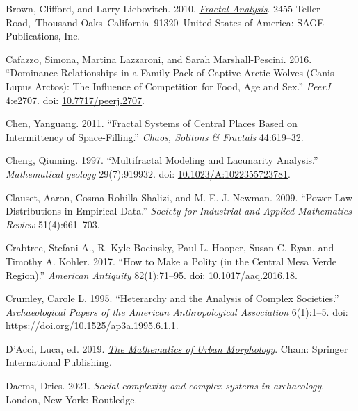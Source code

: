 \documentclass[
  12pt,
]{book}
\newlength{\cslhangindent}
\newlength{\cslentryspacingunit} %
\newenvironment{CSLReferences}[2] %
 {%
  \setlength{\parindent}{0pt}
  \ifodd #1
  \let\oldpar\par
  \def\par{\hangindent=\cslhangindent\oldpar}
  \fi
  \setlength{\parskip}{#2\cslentryspacingunit}
 }%
 {}
\begin{document}
\begin{CSLReferences}{1}{0}
\leavevmode{}%
Brown, Clifford, and Larry Liebovitch. 2010. \emph{\href{https://doi.org/10.4135/9781412993876}{Fractal Analysis}}. 2455 Teller Road,~Thousand Oaks~California~91320~United States of America: SAGE Publications, Inc.

\leavevmode{}%
Cafazzo, Simona, Martina Lazzaroni, and Sarah Marshall-Pescini. 2016. {``Dominance Relationships in a Family Pack of Captive Arctic Wolves (Canis Lupus Arctos): The Influence of Competition for Food, Age and Sex.''} \emph{PeerJ} 4:e2707. doi: \href{https://doi.org/10.7717/peerj.2707}{10.7717/peerj.2707}.

\leavevmode{}%
Chen, Yanguang. 2011. {``Fractal Systems of Central Places Based on Intermittency of Space-Filling.''} \emph{Chaos, Solitons \& Fractals} 44:619--32.

\leavevmode{}%
Cheng, Qiuming. 1997. {``Multifractal Modeling and Lacunarity Analysis.''} \emph{Mathematical geology} 29(7):919932. doi: \href{https://doi.org/10.1023/A:1022355723781}{10.1023/A:1022355723781}.

\leavevmode{}%
Clauset, Aaron, Cosma Rohilla Shalizi, and M. E. J. Newman. 2009. {``Power-Law Distributions in Empirical Data.''} \emph{Society for Industrial and Applied Mathematics Review} 51(4):661--703.

\leavevmode{}%
Crabtree, Stefani A., R. Kyle Bocinsky, Paul L. Hooper, Susan C. Ryan, and Timothy A. Kohler. 2017. {``How to Make a Polity (in the Central Mesa Verde Region).''} \emph{American Antiquity} 82(1):71--95. doi: \href{https://doi.org/10.1017/aaq.2016.18}{10.1017/aaq.2016.18}.

\leavevmode{}%
Crumley, Carole L. 1995. {``Heterarchy and the Analysis of Complex Societies.''} \emph{Archaeological Papers of the American Anthropological Association} 6(1):1--5. doi: \url{https://doi.org/10.1525/ap3a.1995.6.1.1}.

\leavevmode{}%
D'Acci, Luca, ed. 2019. \emph{\href{https://doi.org/10.1007/978-3-030-12381-9}{The Mathematics of Urban Morphology}}. Cham: Springer International Publishing.

\leavevmode{}%
Daems, Dries. 2021. \emph{Social complexity and complex systems in archaeology}. London, New York: Routledge.


\end{CSLReferences}
\end{document}
